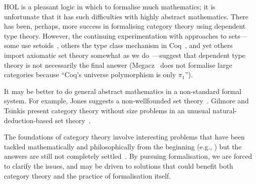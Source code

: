 \documentclass[twoside,titlepage,11pt]{article}
\begin{document}
HOL is a pleasant logic in which to formalise much mathematics; it is unfortunate that it has such difficulties with highly abstract mathematics.
There has been, perhaps, more success in formalising category theory using dependent type theory.
However, the continuing experimentation with approaches to sets---some use setoids~\cite{DBLP:conf/birthday/HuetS00,Carvalho,Wilander}, others the type class mechanism in Coq~\cite{DBLP:conf/mkm/CoquandS07,Sozeau,Megacz}, and yet others import axiomatic set theory somewhat as we do~\cite{Simpson04}---suggest that dependent type theory is not necessarily the final answer (Megacz~\cite{Megacz} does not formalise large categories because ``Coq's universe polymorphism is only $\pi_1$'').

It may be better to do general abstract mathematics in a non-standard formal system.
For example, Jones suggests a non-wellfounded set theory~\cite{RBJones18}.
Gilmore and Tsinkis present category theory without size problems in an unusual natural-deduction-based set theory~\cite{DBLP:journals/tcs/GilmoreT93}. 

The foundations of category theory involve interesting problems that have been tackled mathematically and philosophically from the beginning (e.g., \cite{Blass,springerlink:10.1007/BFb0059147}) but the answers are still not completely settled~\cite{Easwaran}.
By pursuing formalisation, we are forced to clarify the issues, and may be driven to solutions that could benefit both category theory and the practice of formalisation itself.


\end{document}
